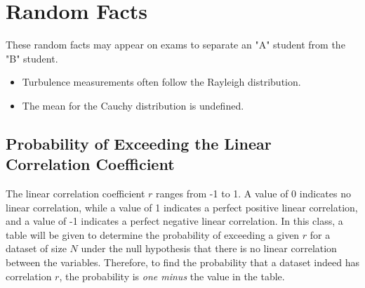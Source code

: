 \section{Random Facts}

These random facts may appear on exams to separate an "A" student from the "B" student.

\begin{itemize}
    \item Turbulence measurements often follow the Rayleigh distribution.
    \item The mean for the Cauchy distribution is undefined.
\end{itemize}

\subsection{Probability of Exceeding the Linear Correlation Coefficient}

The linear correlation coefficient $r$ ranges from -1 to 1. A value of 0 indicates no linear correlation, while a value of 1 indicates a perfect positive linear correlation, and a value of -1 indicates a perfect negative linear correlation. In this class, a table will be given to determine the probability of exceeding a given $r$ for a dataset of size $N$ under the null hypothesis that there is no linear correlation between the variables. Therefore, to find the probability that a dataset indeed has correlation $r$, the probability is \emph{one minus} the value in the table.